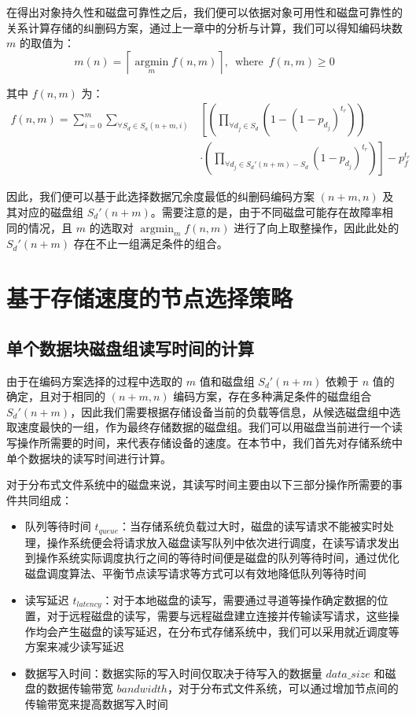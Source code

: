 在得出对象持久性和磁盘可靠性之后，我们便可以依据对象可用性和磁盘可靠性的关系计算存储的纠删码方案，通过上一章中的分析与计算，我们可以得知编码块数 $m$ 的取值为：
\begin{equation}
m(n)=\left\lceil\operatorname*{argmin}_{m}f(n,m)\right\rceil,\ \operatorname*{where}\ f(n,m) \geq 0
\end{equation}

其中 $f(n,m)$ 为：
\begin{equation}
\begin{split}
f(n,m)=\sum_{i=0}^{m}\sum_{{\forall}S_{d}{\in}S_{a}(n+m,i)}&\left[\left(\prod_{{\forall}d_{j}{\in}S_{d}}\left(1-(1-p_{d_j})^{t_r}\right)\right)\right.\\
&\cdot\left.\left(\prod_{{\forall}d_{j}{\in}S_{d}'(n+m)-S_{d}}(1-p_{d_j})^{t_{r}}\right)\right]-p_{f}^{t_{r}}
\end{split}
\end{equation}

因此，我们便可以基于此选择数据冗余度最低的纠删码编码方案 $(n+m,n)$ 及其对应的磁盘组 $S_{d}'(n+m)$。需要注意的是，由于不同磁盘可能存在故障率相同的情况，且 $m$ 的选取对 $\displaystyle\operatorname*{argmin}_{m}f(n,m)$ 进行了向上取整操作，因此此处的 $S_{d}'(n+m)$ 存在不止一组满足条件的组合。
\section{基于存储速度的节点选择策略}
\subsection{单个数据块磁盘组读写时间的计算}
由于在编码方案选择的过程中选取的 $m$ 值和磁盘组 $S_{d}'(n+m)$ 依赖于 $n$ 值的确定，且对于相同的 $(n+m,n)$ 编码方案，存在多种满足条件的磁盘组合 $S_{d}'(n+m)$，因此我们需要根据存储设备当前的负载等信息，从候选磁盘组中选取速度最快的一组，作为最终存储数据的磁盘组。我们可以用磁盘当前进行一个读写操作所需要的时间，来代表存储设备的速度。在本节中，我们首先对存储系统中单个数据块的读写时间进行计算。

对于分布式文件系统中的磁盘来说，其读写时间主要由以下三部分操作所需要的事件共同组成：
\begin{itemize}
\item 队列等待时间 $t_{queue}$：当存储系统负载过大时，磁盘的读写请求不能被实时处理，操作系统便会将请求放入磁盘读写队列中依次进行调度，在读写请求发出到操作系统实际调度执行之间的等待时间便是磁盘的队列等待时间，通过优化磁盘调度算法、平衡节点读写请求等方式可以有效地降低队列等待时间
\item 读写延迟 $t_{latency}$：对于本地磁盘的读写，需要通过寻道等操作确定数据的位置，对于远程磁盘的读写，需要与远程磁盘建立连接并传输读写请求，这些操作均会产生磁盘的读写延迟，在分布式存储系统中，我们可以采用就近调度等方案来减少读写延迟
\item 数据写入时间：数据实际的写入时间仅取决于待写入的数据量 $data\_size$ 和磁盘的数据传输带宽 $bandwidth$，对于分布式文件系统，可以通过增加节点间的传输带宽来提高数据写入时间
\end{itemize}

